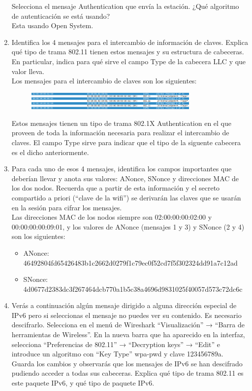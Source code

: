 \documentclass[12pt, a4paper]{report}
\begin{document}
\begin{enumerate}
	Selecciona el mensaje Authentication que envía la estación. ¿Qué algoritmo de autenticación se
	está usando?\\
	
	Esta usando Open System.
	\item Identifica los 4 mensajes para el intercambio de información de claves. Explica qué tipo de trama
	802.11 tienen estos mensajes y su estructura de cabeceras. En particular, indica para qué sirve
	el campo Type de la cabecera LLC y que valor lleva.\\
	
	Los mensajes para el intercambio de claves son los siguientes:
	\begin{figure}[H]
		\centering
		\includegraphics[width=0.8\textwidth]{ej3.4}\\
	\end{figure}
	Estos mensajes tienen un tipo de trama 802.1X Authentication en el que proveen de toda la información necesaria para realizar el intercambio de claves. El campo Type sirve para indicar que el tipo de la siguente cabecera es el dicho anteriormente.
	\item Para cada uno de esos 4 mensajes, identifica los campos importantes que deberían llevar y anota
	sus valores: ANonce, SNonce y direcciones MAC de los dos nodos. Recuerda que a partir de esta
	información y el secreto compartido a priori (“clave de la wifi”) se derivarán las claves que se
	usarán en la sesión para cifrar los mensajes.\\
	
	Las direcciones MAC de los nodos siempre son 02:00:00:00:02:00 y 00:00:00:00:09:01, y los valores de ANonce (mensajes 1 y 3) y SNonce (2 y 4) son los siguientes:
	\begin{itemize}
		\item ANonce: 46492804fd65426483b1c2662d0279f1c79ec0f52cd7f5f302324dd91a7c12ad\\
		\item SNonce: 4d0677d2383dc3f267464dcb770a1b5c38a4696d9831025f40057d573c72dc6c
	\end{itemize}
	
	\item Verás a continuación algún mensaje dirigido a alguna dirección especial de IPv6 pero si seleccionas el mensaje no puedes ver su contenido. Es necesario descifrarlo. Selecciona en el menú
	de Wireshark “Visualización” → “Barra de herramientas de Wireless”. En la nueva barra que
	ha aparecido en la interfaz, selecciona “Preferencias de 802.11” → “Decryption keys” → “Edit”
	e introduce un algoritmo con “Key Type” wpa-pwd y clave 123456789a. Guarda los cambios y
	observarás que los mensajes de IPv6 se han descifrado pudiendo acceder a todas sus cabeceras.
	Explica qué tipo de trama 802.11 es este paquete IPv6, y qué tipo de paquete IPv6.\\
	

\end{enumerate}
\end{document}
